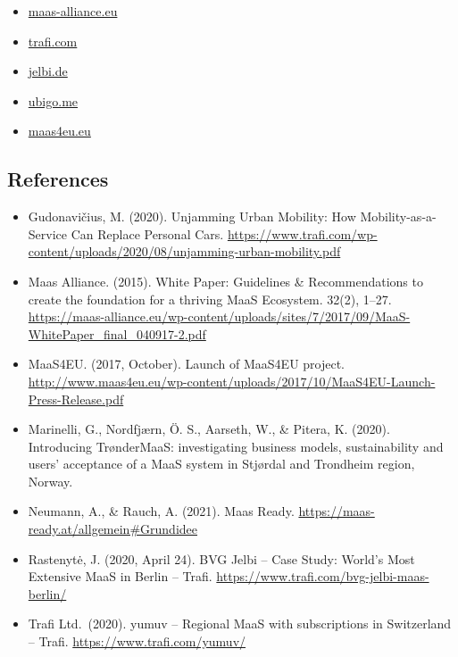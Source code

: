 \documentclass[
]{book}
\providecommand{\tightlist}{%
  \setlength{\itemsep}{0pt}\setlength{\parskip}{0pt}}
\begin{document}
\begin{itemize}
\tightlist
\item
  \href{https://maas-alliance.eu/wp-content/uploads/sites/7/2017/09/MaaS-WhitePaper_final_040917-2.pdf}{maas-alliance.eu}
\item
  \href{https://www.trafi.com}{trafi.com}
\item
  \href{https://www.jelbi.de}{jelbi.de}
\item
  \href{https://www.ubigo.me/en/about-ubigo}{ubigo.me}
\item
  \href{http://www.maas4eu.eu}{maas4eu.eu}
\end{itemize}

\hypertarget{references-10}{%
\subsection*{References}\label{references-10}}

\begin{itemize}
\tightlist
\item
  Gudonavičius, M. (2020). Unjamming Urban Mobility: How Mobility-as-a-Service Can Replace Personal Cars. \url{https://www.trafi.com/wp-content/uploads/2020/08/unjamming-urban-mobility.pdf}
\item
  Maas Alliance. (2015). White Paper: Guidelines \& Recommendations to create the foundation for a thriving MaaS Ecosystem. 32(2), 1--27. \url{https://maas-alliance.eu/wp-content/uploads/sites/7/2017/09/MaaS-WhitePaper_final_040917-2.pdf}
\item
  MaaS4EU. (2017, October). Launch of MaaS4EU project. \url{http://www.maas4eu.eu/wp-content/uploads/2017/10/MaaS4EU-Launch-Press-Release.pdf}
\item
  Marinelli, G., Nordfjærn, Ö. S., Aarseth, W., \& Pitera, K. (2020). Introducing TrønderMaaS: investigating business models, sustainability and users' acceptance of a MaaS system in Stjørdal and Trondheim region, Norway.
\item
  Neumann, A., \& Rauch, A. (2021). Maas Ready. \url{https://maas-ready.at/allgemein\#Grundidee}
\item
  Rastenytė, J. (2020, April 24). BVG Jelbi -- Case Study: World's Most Extensive MaaS in Berlin -- Trafi. \url{https://www.trafi.com/bvg-jelbi-maas-berlin/}
\item
  Trafi Ltd.~(2020). yumuv -- Regional MaaS with subscriptions in Switzerland -- Trafi. \url{https://www.trafi.com/yumuv/}
\end{itemize}
\end{document}

